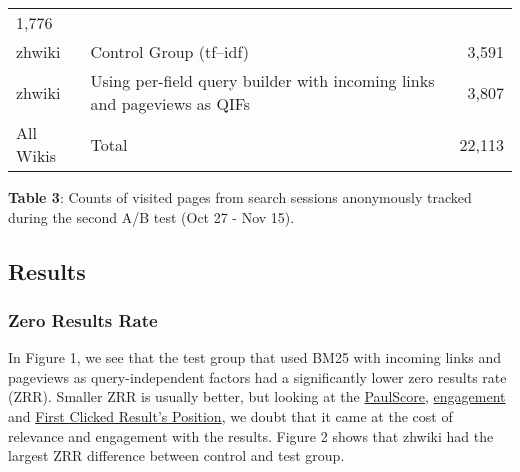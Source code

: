 \documentclass[12pt,]{article}
\begin{document}
\begin{longtable}[]{@{}llr@{}}
\begin{minipage}[t]{0.14\columnwidth}
1,776\strut
\end{minipage}\tabularnewline
\begin{minipage}[t]{0.10\columnwidth}\raggedright\strut
zhwiki\strut
\end{minipage} & \begin{minipage}[t]{0.67\columnwidth}\raggedright\strut
Control Group (tf--idf)\strut
\end{minipage} & \begin{minipage}[t]{0.14\columnwidth}\raggedleft\strut
3,591\strut
\end{minipage}\tabularnewline
\begin{minipage}[t]{0.10\columnwidth}\raggedright\strut
zhwiki\strut
\end{minipage} & \begin{minipage}[t]{0.67\columnwidth}\raggedright\strut
Using per-field query builder with incoming links and pageviews as
QIFs\strut
\end{minipage} & \begin{minipage}[t]{0.14\columnwidth}\raggedleft\strut
3,807\strut
\end{minipage}\tabularnewline
\begin{minipage}[t]{0.10\columnwidth}\raggedright\strut
All Wikis\strut
\end{minipage} & \begin{minipage}[t]{0.67\columnwidth}\raggedright\strut
Total\strut
\end{minipage} & \begin{minipage}[t]{0.14\columnwidth}\raggedleft\strut
22,113\strut
\end{minipage}\tabularnewline
\bottomrule
\end{longtable}

\textbf{Table 3}: Counts of visited pages from search sessions
anonymously tracked during the second A/B test (Oct 27 - Nov 15).

\subsection{Results}\label{results}

\subsubsection{Zero Results Rate}\label{zero-results-rate}

In Figure 1, we see that the test group that used BM25 with incoming
links and pageviews as query-independent factors had a significantly
lower zero results rate (ZRR). Smaller ZRR is usually better, but
looking at the \protect\hyperlink{paulscore}{PaulScore},
\protect\hyperlink{engagement}{engagement} and
\protect\hyperlink{first_clicked_resultux2019s_position}{First Clicked
Result's Position}, we doubt that it came at the cost of relevance and
engagement with the results. Figure 2 shows that zhwiki had the largest
ZRR difference between control and test group.
\end{document}

